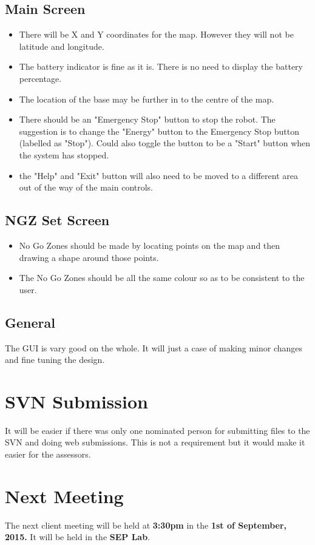 \documentclass[a4paper]{article}
\begin{document}
\subsection{Main Screen}
\begin{itemize}
	\item There will be X and Y coordinates for the map. However they will not be latitude and longitude.
	\item The battery indicator is fine as it is. There is no need to display the battery percentage.
	\item The location of the base may be further in to the centre of the map.
	\item There should be an "Emergency Stop" button to stop the robot. The suggestion is to change the "Energy" button to the Emergency Stop button (labelled as "Stop"). Could also toggle the button to be a "Start" button when the system has stopped.
	\item the "Help" and "Exit" button will also need to be moved to a different area out of the way of the main controls.
\end{itemize}

\subsection{NGZ Set Screen}
\begin{itemize}
	\item No Go Zones should be made by locating points on the map and then drawing a shape around those points.
	\item The No Go Zones should be all the same colour so as to be consistent to the user. 
\end{itemize}

\subsection{General}
The GUI is vary good on the whole. It will just a case of making minor changes and fine tuning the design.

\section{SVN Submission}
It will be easier if there was only one nominated person for submitting files to the SVN and doing web submissions. This is not a requirement but it would make it easier for the assessors.

\section{Next Meeting}
The next client meeting will be held at \textbf{3:30pm} in the \textbf{1st of September, 2015.} It will be held in the \textbf{SEP Lab}.
\end{document}
